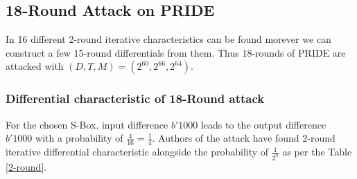 \documentclass{transcrypto}
\begin{document}
	\subsection{18-Round Attack on PRIDE}
	In\cite{cryptoeprint:2014:525} 16 different 2-round iterative characteristics can be found morever we can construct a few 15-round differentials from them. Thus 18-rounds of PRIDE are attacked with \textbf{$ (D,T,M) = (2^{60},2^{66},2^{64}) $}.
	\subsubsection{Differential characteristic of 18-Round attack}
	For the chosen S-Box, input difference $ b'1000 $ leads to the output difference $b'1000$  with a probability of $ \frac{4}{16} = \frac{1}{4} $. Authors of the attack have found 2-round iterative differential characteristic alongside the probability of $ \frac{1}{2^{8}} $ as per the Table \ref{2-round}.
\end{document}
